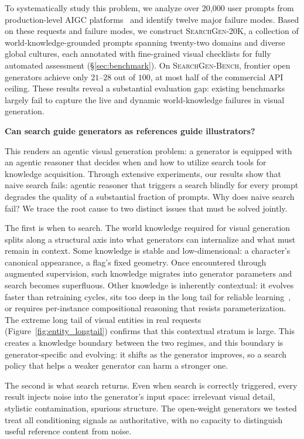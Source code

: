 \documentclass{article}
\newcommand{\bench}{\textsc{SearchGen-Bench}}
\newcommand{\dataset}{\textsc{SearchGen-20K}}
\begin{document}
To systematically study this problem, we analyze over 20{,}000 user prompts from production-level AIGC platforms~\citep{qwenimage} and identify twelve major failure modes.
Based on these requests and failure modes, we construct \dataset{}, a collection of world-knowledge-grounded prompts spanning twenty-two domains and diverse global cultures, each annotated with fine-grained visual checklists for fully automated assessment (\S\ref{sec:benchmark}).
On \bench{}, frontier open generators achieve only $21$--$28$ out of $100$, at most half of the commercial API ceiling.
These results reveal a substantial evaluation gap: existing benchmarks largely fail to capture the live and dynamic world-knowledge failures in visual generation.
\begin{center}
    \textbf{Can search guide generators as references guide illustrators?} 
\end{center}


{This renders an agentic visual generation problem: a generator is equipped with an agentic reasoner that decides when and how to utilize search tools for knowledge acquisition.}
Through extensive experiments, our results show that naive search fails: agentic reasoner that triggers a search blindly for every prompt degrades the quality of a substantial fraction of prompts.
Why does naive search fail? We trace the root cause to two distinct issues that must be solved jointly.

The first is when to search. The world knowledge required for visual generation splits along a structural axis into what generators can internalize and what must remain in context. Some knowledge is stable and low-dimensional: a character's canonical appearance, a flag's fixed geometry. Once encountered through augmented supervision, such knowledge migrates into generator parameters and search becomes superfluous. Other knowledge is inherently contextual: it evolves faster than retraining cycles, sits too deep in the long tail for reliable learning~\cite{valiant1984theory}, or requires per-instance compositional reasoning that resists parameterization. The extreme long tail of visual entities in real requests (Figure~\ref{fig:entity_longtail}) confirms that this contextual stratum is large. This creates a knowledge boundary between the two regimes, and this boundary is generator-specific {and evolving}: it shifts as the generator improves, so a search policy that helps a weaker generator can harm a stronger one.

The second is what search returns. Even when search is correctly triggered, every result injects noise into the generator's input space: irrelevant visual detail, stylistic contamination, spurious structure. The open-weight generators we tested treat all conditioning signals as authoritative, with no capacity to distinguish useful reference content from noise.
\end{document}

